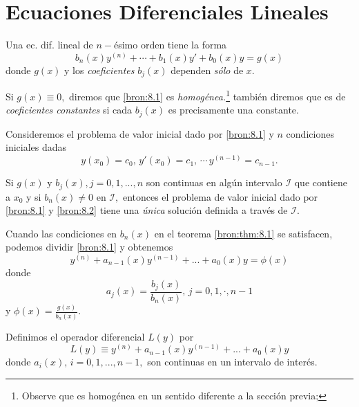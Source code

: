 \section{Ecuaciones Diferenciales Lineales}


	Una ec. dif. lineal de $n-$\'esimo orden tiene la forma
	\begin{equation}
		\label{bron:8.1}
		b_{n}(x)y^{(n)}+\cdots+b_{1}(x)y'+b_{0}(x)y=g(x)
	\end{equation}
	donde $g(x)$ y los \emph{coeficientes} $b_{j}(x)$ dependen \emph{s\'olo} de $x.$



	Si $g(x)\equiv 0,$ diremos que \eqref{bron:8.1} es \emph{homog\'enea.}\footnote{Observe que es homog\'enea en un sentido diferente a la secci\'on previa;} tambi\'en diremos que es de \emph{coeficientes constantes} si cada $b_{j}(x)$ es precisamente una constante.
	



	\begin{thm}
		\label{bron:thm:8.1}
		Consideremos el problema de valor inicial dado por \eqref{bron:8.1} y $n$ condiciones iniciales dadas
		\begin{equation}
			\label{bron:8.2}
			y(x_{0})=c_{0}, \, y'(x_{0})=c_{1}, \, \cdots \, y^{(n-1)}=c_{n-1}.
		\end{equation}
		
		Si $g(x)$ y $b_{j}(x), j=0,1,...,n$ son continuas en algún intervalo $\mathcal{I}$ que contiene a $x_{0}$ y si $b_{n}(x)\neq 0$ en $\mathcal{I},$ entonces el problema de valor inicial dado por \eqref{bron:8.1} y \eqref{bron:8.2} tiene una \emph{única} soluci\'on definida a trav\'es de $\mathcal{I}.$
	\end{thm}
	



	Cuando las condiciones en $b_{n}(x)$ en el teorema \ref{bron:thm:8.1} se satisfacen, podemos dividir \eqref{bron:8.1} y obtenemos
	\begin{equation}
		\label{bron:8.3}
		y^{(n)}+a_{n-1}(x)y^{(n-1)}+...+a_{0}(x)y=\phi(x)
	\end{equation}
	donde $$a_{j}(x)=\dfrac{b_{j}(x)}{b_{n}(x)}, \, j=0,1,\cdot, n-1$$ y
	$\phi(x)=\frac{g(x)}{b_{n}(x)}.$
	



	Definimos el operador diferencial $L(y)$ por
	\begin{equation}
		\label{bron:8.4}
		L(y)\equiv y^{(n)}+a_{n-1}(x)y^{(n-1)}+...+a_{0}(x)y
	\end{equation}
	donde $a_{i}(x), \, i=0,1,...,n-1,$ son continuas en un intervalo de inter\'es.
	



